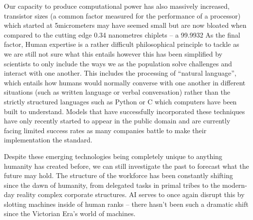Our capacity to produce computational power has also massively increased, transistor sizes (a common factor measured for the performance of a processor) which started at 5micrometers may have seemed small but are now bloated when compared to the cutting edge 0.34 nanometres chiplets – a 99.9932%
As the final factor, Human expertise is a rather difficult philosophical principle to tackle as we are still not sure what this entails however this has been simplified by scientists to only include the ways we as the population solve challenges and interact with one another. This includes the processing of “natural language”, which entails how humans would normally converse with one another in different situations (such as written language or verbal conversation) rather than the strictly structured languages such as Python or C which computers have been built to understand. Models that have successfully incorporated these techniques have only recently started to appear in the public domain and are currently facing limited success rates as many companies battle to make their implementation the standard.

Despite these emerging technologies being completely unique to anything humanity has created before, we can still investigate the past to forecast what the future may hold. The structure of the workforce has been constantly shifting since the dawn of humanity, from delegated tasks in primal tribes to the modern-day reality complex corporate structures. AI serves to once again disrupt this by slotting machines inside of human ranks – there hasn’t been such a dramatic shift since the Victorian Era’s world of machines.


